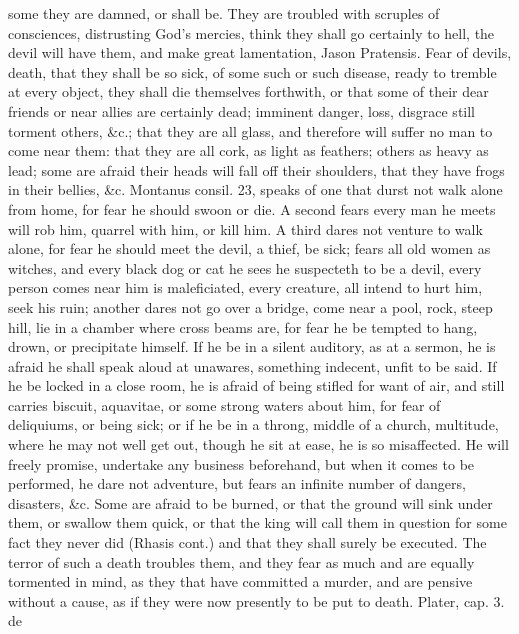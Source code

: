 {some they are damned, or shall be. They are troubled with
scruples of consciences, distrusting God's mercies, think they shall go
certainly to hell, the devil will have them, and make great
lamentation, Jason Pratensis. Fear of devils, death, that they shall be
so sick, of some such or such disease, ready to tremble at every
object, they shall die themselves forthwith, or that some of their dear
friends or near allies are certainly dead; imminent danger, loss,
disgrace still torment others, \&c.; that they are all glass, and
therefore will suffer no man to come near them: that they are all cork,
as light as feathers; others as heavy as lead; some are afraid their
heads will fall off their shoulders, that they have frogs in their
bellies, \&c. Montanus consil. 23, speaks of one that durst not
walk alone from home, for fear he should swoon or die. A second
fears every man he meets will rob him, quarrel with him, or kill
him. A third dares not venture to walk alone, for fear he should meet
the devil, a thief, be sick; fears all old women as witches, and every
black dog or cat he sees he suspecteth to be a devil, every person
comes near him is maleficiated, every creature, all intend to hurt him,
seek his ruin; another dares not go over a bridge, come near a pool,
rock, steep hill, lie in a chamber where cross beams are, for fear he
be tempted to hang, drown, or precipitate himself. If he be in a silent
auditory, as at a sermon, he is afraid he shall speak aloud at
unawares, something indecent, unfit to be said. If he be locked in a
close room, he is afraid of being stifled for want of air, and still
carries biscuit, aquavitae, or some strong waters about him, for fear
of deliquiums, or being sick; or if he be in a throng, middle of a
church, multitude, where he may not well get out, though he sit at
ease, he is so misaffected. He will freely promise, undertake any
business beforehand, but when it comes to be performed, he dare not
adventure, but fears an infinite number of dangers, disasters, \&c. Some
are  afraid to be burned, or that the ground will sink
under them, or swallow them quick, or that the king will call
them in question for some fact they never did (Rhasis cont.) and that
they shall surely be executed. The terror of such a death troubles
them, and they fear as much and are equally tormented in mind, as
they that have committed a murder, and are pensive without a cause, as
if they were now presently to be put to death. Plater, cap. 3. de
}
